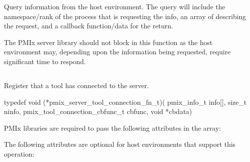 \optattrend
\descr

Query information from the host environment.
The query will include the namespace/rank of the process that is requesting the info, an array of  describing the request, and a callback function/data for the return.

\adviceimplstart
The \ac{PMIx} server library should not block in this function as the host environment may, depending upon the information being requested, require significant time to respond.
\adviceimplend



\subsection{}

\summary

Register that a tool has connected to the server.

\format

\cspecificstart
\begin{codepar}
typedef void (*pmix_server_tool_connection_fn_t)(
                             pmix_info_t info[], size_t ninfo,
                             pmix_tool_connection_cbfunc_t cbfunc,
                             void *cbdata)
\end{codepar}
\cspecificend

\begin{arglist}
\end{arglist}

\reqattrstart
\ac{PMIx} libraries are required to pass the following attributes in the  array:


\reqattrend


\optattrstart
The following attributes are optional for host environments that support this operation:


